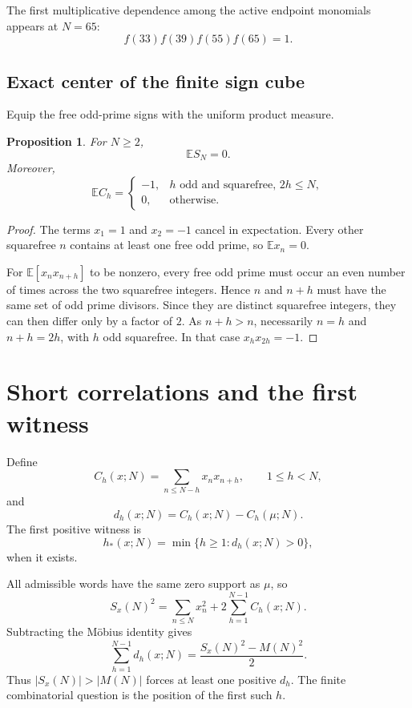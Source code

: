 \documentclass[11pt]{article}
\newtheorem{proposition}[theorem]{Proposition}
\begin{document}
The first multiplicative dependence among the active endpoint monomials appears at $N=65$:
\[
 \boxed{
 f(33)f(39)f(55)f(65)=1.
 }
\]

\subsection{Exact center of the finite sign cube}

Equip the free odd-prime signs with the uniform product measure.

\begin{proposition}
For $N\ge2$,
\[
 \boxed{\mathbb E S_N=0.}
\]
Moreover,
\[
 \boxed{
 \mathbb E C_h=
 \begin{cases}
 -1,& h\text{ odd and squarefree, }2h\le N,\\
 0,&\text{otherwise}.
 \end{cases}
 }
\]
\end{proposition}

\begin{proof}
The terms $x_1=1$ and $x_2=-1$ cancel in expectation.  Every other squarefree $n$ contains at least one free odd prime, so $\mathbb E x_n=0$.

For $\mathbb E[x_nx_{n+h}]$ to be nonzero, every free odd prime must occur an even number of times across the two squarefree integers.  Hence $n$ and $n+h$ must have the same set of odd prime divisors.  Since they are distinct squarefree integers, they can then differ only by a factor of $2$.  As $n+h>n$, necessarily $n=h$ and $n+h=2h$, with $h$ odd squarefree.  In that case $x_hx_{2h}=-1$.
\end{proof}

\section{Short correlations and the first witness}

Define
\[
 C_h(x;N)=\sum_{n\le N-h}x_nx_{n+h},
 \qquad 1\le h<N,
\]
and
\[
 \boxed{
 d_h(x;N)=C_h(x;N)-C_h(\mu;N).
 }
\]
The first positive witness is
\[
 \boxed{
 h_*(x;N)=\min\{h\ge1:d_h(x;N)>0\},
 }
\]
when it exists.

All admissible words have the same zero support as $\mu$, so
\[
 S_x(N)^2=\sum_{n\le N}x_n^2+
 2\sum_{h=1}^{N-1}C_h(x;N).
\]
Subtracting the M\"obius identity gives
\[
 \boxed{
 \sum_{h=1}^{N-1}d_h(x;N)
 =\frac{S_x(N)^2-M(N)^2}{2}.
 }
\]
Thus $|S_x(N)|>|M(N)|$ forces at least one positive $d_h$.  The finite combinatorial question is the position of the first such $h$.
\end{document}

